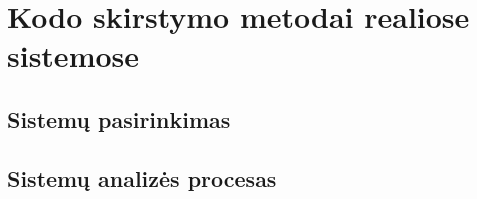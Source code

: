 \section{Kodo skirstymo metodai realiose sistemose}
\subsection{Sistemų pasirinkimas}

\subsection{Sistemų analizės procesas}
